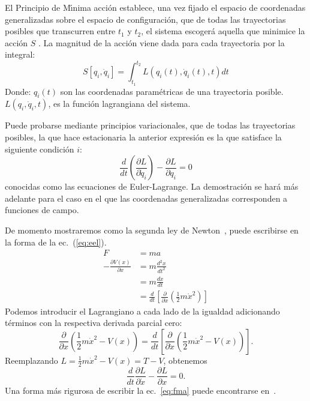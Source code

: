 El Principio de M\'\i nima acci\'on establece, una vez fijado el espacio de
coordenadas generalizadas sobre el espacio de configuraci\'on, que de
todas las trayectorias posibles que transcurren entre $t_1$ y $t_2$,
el sistema escoger\'a aquella que minimice la acci\'on $S$
\cite{ActionPhysics}.  La magnitud de la acci\'on viene dada para cada
trayectoria por la integral:
\begin{equation}
  \label{eq:la}
   S\left[q_i,\dot{q}_i\right] = \int_{t_{1}}^{t_{2}} L(q_i(t), \dot{q}_i(t),t) dt
\end{equation}
Donde:
$q_i(t)$ son las coordenadas param\'etricas de una trayectoria posible.
$L(q_i,\dot{q}_i,t)$, es la funci\'on lagrangiana del sistema.


Puede probarse mediante principios variacionales, que de todas las trayectorias posibles, la que hace  estacionaria la anterior expresi\'on es la que satisface la siguiente condici\'on $i$:
\begin{equation}
  \label{eq:eel}
 \frac{d}{dt} \left ( \frac{\partial L}{\partial\dot{q}_i} \right ) - \frac{\partial L}{\partial q_i} = 0
\end{equation}
conocidas como las ecuaciones de Euler-Lagrange. La demostraci\'on se
har\'a m\'as adelante para el caso en el que las coordenadas generalizadas
corresponden a funciones de campo. 

De momento mostraremos como la segunda ley de Newton~\cite{NewtonSeconLaw}, puede escribirse en la forma de la ec.~(\ref{eq:eel}).
\begin{align}
\label{eq:fma}
  F&=ma\\
  -\frac{\partial V(x)}{\partial x}&=m\frac{d^2x}{dt^2}\nonumber\\
  &=m\frac{d\dot{x}}{dt}\nonumber\\
  &=\frac{d}{dt}
  \left[
    \frac{\partial}{\partial\dot{x}}
    \left(
      \frac{1}{2}m\dot{x}^2
    \right)
  \right]\nonumber
\end{align}
Podemos introducir el Lagrangiano a cada lado de la igualdad adicionando t\'erminos con la respectiva derivada parcial cero:
\begin{equation*}
  \frac{\partial}{\partial x}
  \left(
\frac{1}{2}m\dot{x}^2-V(x)
  \right)=\frac{d}{dt}
  \left[
    \frac{\partial}{\partial\dot{x}}
    \left(
      \frac{1}{2}m\dot{x}^2-V(x)
    \right)
  \right].
\end{equation*}
Reemplazando $L=\frac{1}{2}m\dot{x}^2-V(x)=T-V$, obtenemos
\begin{equation*}
\frac{d}{dt}\frac{\partial L}{\partial\dot{x}}  -\frac{\partial L}{\partial x}=0.
\end{equation*}
Una forma m\'as rigurosa de escribir la ec.~\eqref{eq:fma} puede encontrarse en~\cite{ActionPhysics}. 

